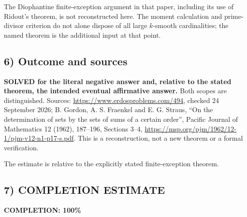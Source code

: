 The Diophantine finite-exception argument in that paper, including its use of Ridout's theorem, is not reconstructed here. The moment calculation and prime-divisor criterion do not alone dispose of all large $k$-smooth cardinalities; the named theorem is the additional input at that point.

\subsection*{6) Outcome and sources}
\textbf{SOLVED for the literal negative answer and, relative to the stated theorem, the intended eventual affirmative answer.} Both scopes are distinguished. Sources: \url{https://www.erdosproblems.com/494}, checked 24 September 2026; B. Gordon, A. S. Fraenkel and E. G. Straus, ``On the determination of sets by the sets of sums of a certain order'', Pacific Journal of Mathematics 12 (1962), 187--196, Sections 3--4, \url{https://msp.org/pjm/1962/12-1/pjm-v12-n1-p17-s.pdf}. This is a reconstruction, not a new theorem or a formal verification.

The estimate is relative to the explicitly stated finite-exception theorem.
\subsection*{7) COMPLETION ESTIMATE}
\textbf{COMPLETION: 100\%}

